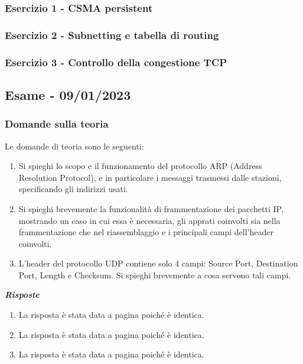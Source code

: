 \documentclass[a4paper]{article}
\begin{document}
	\subsubsection{Esercizio 1 - CSMA persistent}
	
	\subsubsection{Esercizio 2 - Subnetting e tabella di routing}
	
	\subsubsection{Esercizio 3 - Controllo della congestione TCP}
	
	\newpage

	\subsection[\textbf{Esame - 09/01/2023}]{Esame - 09/01/2023}
	
	\subsubsection{Domande sulla teoria}
	Le domande di teoria sono le seguenti:
	\begin{enumerate}
		\item Si spieghi lo scopo e il funzionamento del protocollo ARP (Address Resolution Protocol), e in particolare i messaggi trasmessi dalle stazioni, specificando gli indirizzi usati.
		
		\item Si spieghi brevemente la funzionalità di frammentazione dei pacchetti IP, mostrando un caso in cui essa è necessaria, gli apprati coinvolti sia nella frammentazione che nel riassemblaggio e i principali campi dell'header coinvolti.
		
		\item L'header del protocollo UDP contiene solo 4 campi: Source Port, Destination Port, Length e Checksum. Si spieghi brevemente a cosa servono tali campi.
	\end{enumerate}
	\textcolor{Green4}{\textbf{\emph{Risposte}}}
	\begin{enumerate}
		\item La risposta è stata data a pagina \pageref{ARP} poiché è identica.
		
		\item La risposta è stata data a pagina \pageref{frammentazione IP} poiché è identica.
		
		\item La risposta è stata data a pagina \pageref{header UDP} poiché è identica.
	\end{enumerate}
	
\end{document}
